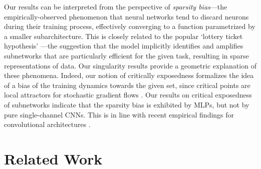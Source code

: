 \documentclass{article} %
\theoremstyle{plain}%
\theoremstyle{definition}
\theoremstyle{remark}
\begin{document}
Our results can be interpreted from the perspective of \emph{sparsity bias}---the empirically-observed phenomenon that neural networks tend to discard neurons during their training process, effectively converging to a function parametrized by a smaller subarchitecture. This is closely related to the popular `lottery ticket hypothesis' \citep{frankle2018lottery}---the suggestion that the model implicitly identifies and amplifies subnetworks that are particularly efficient for the given task, resulting in sparse representations of data. Our singularity results provide a geometric explanation of these phenomena. Indeed, our notion of critically exposedness formalizes the idea of a bias of the training dynamics towards the given set, since critical points are local attractors for stochastic gradient flows \citep{chen2023stochastic}. 
Our results on critical exposedness of subnetworks indicate that the sparsity bias is exhibited by MLPs, but not by pure single-channel CNNs. This is in line with recent empirical findings for convolutional architectures \citep{blumenfeld2020beyond}. 


\section{Related Work}\label{sec:relwork}
\end{document}
